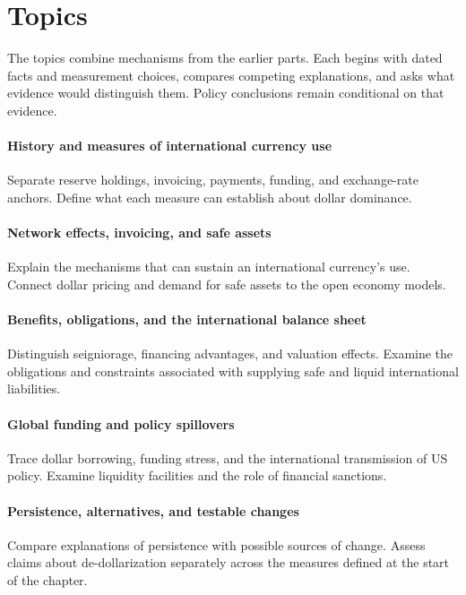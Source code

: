 \clearpage
\part{Topics}\label{part:topics}

The topics combine mechanisms from the earlier parts. Each begins with dated
facts and measurement choices, compares competing explanations, and asks what
evidence would distinguish them. Policy conclusions remain conditional on
that evidence.

\clearpage
{}\label{sec:dollar}

\subsection{History and measures of international currency use}
Separate reserve holdings, invoicing, payments, funding, and exchange-rate
anchors. Define what each measure can establish about dollar dominance.

\subsection{Network effects, invoicing, and safe assets}
Explain the mechanisms that can sustain an international currency's use.
Connect dollar pricing and demand for safe assets to the open economy models.

\subsection{Benefits, obligations, and the international balance sheet}
Distinguish seigniorage, financing advantages, and valuation effects.
Examine the obligations and constraints associated with supplying safe and
liquid international liabilities.

\subsection{Global funding and policy spillovers}
Trace dollar borrowing, funding stress, and the international transmission of
US policy. Examine liquidity facilities and the role of financial sanctions.

\subsection{Persistence, alternatives, and testable changes}
Compare explanations of persistence with possible sources of change.
Assess claims about de-dollarization separately across the measures defined
at the start of the chapter.

